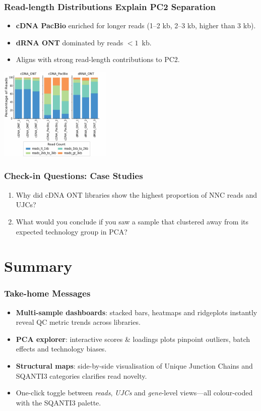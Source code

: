 \documentclass[aspectratio=169]{beamer}
\begin{document}
\begin{frame}
  \frametitle{Read-length Distributions Explain PC2 Separation}
  \begin{itemize}
    \item \textbf{cDNA PacBio} enriched for longer reads (1–2 kb, 2–3 kb, higher than 3 kb).
    \item \textbf{dRNA ONT} dominated by reads $<1$~kb.
    \item Aligns with strong read-length contributions to PC2.
  \end{itemize}
  \vspace{0.3cm}
  \centering
  \includegraphics[width=0.4\textwidth]{Genome Res_figure2_e.jpg}
\end{frame}

\begin{frame}
  \frametitle{Check-in Questions: Case Studies}
  \begin{enumerate}
    \item Why did cDNA ONT libraries show the highest proportion of NNC reads and UJCs?
    \vspace{0.5cm}
    \item What would you conclude if you saw a sample that clustered away from its expected technology group in PCA?
  \end{enumerate}
\end{frame}

\section{Summary}

\begin{frame}
  \frametitle{Take-home Messages}
  \begin{itemize}
    \item \textbf{Multi-sample dashboards}: stacked bars, heatmaps and ridgeplots instantly reveal QC metric trends across libraries.
    \item \textbf{PCA explorer}: interactive scores \& loadings plots pinpoint outliers, batch effects and technology biases.
    \item \textbf{Structural maps}: side-by-side visualisation of Unique Junction Chains and SQANTI3 categories clarifies read novelty.
    \item One-click toggle between \emph{reads}, \emph{UJCs} and \emph{gene}-level views—all colour-coded with the SQANTI3 palette.
  \end{itemize}
\end{frame}
\end{document}
